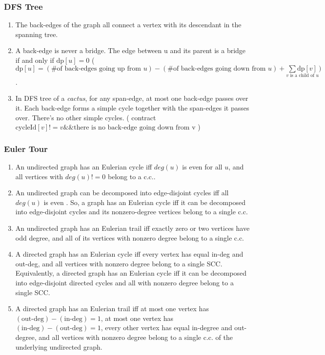 \subsubsection{DFS Tree}
\begin{enumerate}
	\setlength\itemsep{-0.5em}
	\item The back-edges of the graph all connect a vertex with its descendant in the spanning tree.
	\item A back-edge is never a bridge. The edge between u and its parent is a bridge if and only if $\mathrm{dp}[u] = 0$ ( $\mathrm{dp}[u] = (\text{\# of back-edges going up from } u) - (\text{\# of back-edges going down from } u) + \underset{v \text{ is a child of } u}{\sum \mathrm{dp}[v]} )$.
	\item In DFS tree of a \emph{cactus}, for any span-edge, at most one back-edge passes over it. Each back-edge forms a simple cycle together with the span-edges it passes over. There's no other simple cycles. ( contract $\mathrm{cycleId}[v] != v \&\& \text{there is no back-edge going down from v}$ )
\end{enumerate}
\subsubsection{Euler Tour}
\begin{enumerate}
	\setlength\itemsep{-0.5em}
	\item An undirected graph has an Eulerian cycle iff $deg(u)$ is even for all $u$, and all vertices with $deg(u)!=0$ belong to a c.c..
	\item An undirected graph can be decomposed into edge-disjoint cycles iff all $deg(u)$ is even . So, a graph has an Eulerian cycle iff it can be decomposed into edge-disjoint cycles and its nonzero-degree vertices belong to a single c.c.
	\item An undirected graph has an Eulerian trail iff exactly zero or two vertices have odd degree, and all of its vertices with nonzero degree belong to a single c.c.
	\item A directed graph has an Eulerian cycle iff every vertex has equal in-deg and out-deg, and all vertices with nonzero degree belong to a single SCC. Equivalently, a directed graph has an Eulerian cycle iff it can be decomposed into edge-disjoint directed cycles and all with nonzero degree belong to a single SCC.
	\item A directed graph has an Eulerian trail iff at most one vertex has $(\text{out-deg}) − (\text{in-deg}) = 1$, at most one vertex has $(\text{in-deg}) − (\text{out-deg}) = 1$, every other vertex has equal in-degree and out-degree, and all vertices with nonzero degree belong to a single c.c. of the underlying undirected graph.
\end{enumerate}

